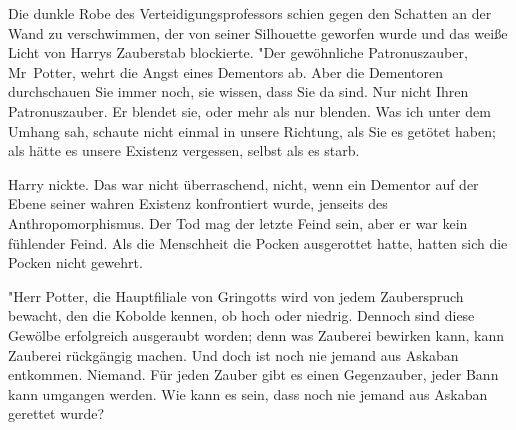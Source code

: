 Die dunkle Robe des Verteidigungsprofessors schien gegen den Schatten an der Wand zu verschwimmen, der von seiner Silhouette geworfen wurde und das weiße Licht von Harrys Zauberstab blockierte. "Der gewöhnliche Patronuszauber, Mr~Potter, wehrt die Angst eines Dementors ab. Aber die Dementoren durchschauen Sie immer noch, sie wissen, dass Sie da sind. Nur nicht Ihren Patronuszauber. Er blendet sie, oder mehr als nur blenden. Was ich unter dem Umhang sah, schaute nicht einmal in unsere Richtung, als Sie es getötet haben; als hätte es unsere Existenz vergessen, selbst als es starb.

Harry nickte. Das war nicht überraschend, nicht, wenn ein Dementor auf der Ebene seiner wahren Existenz konfrontiert wurde, jenseits des Anthropomorphismus. Der Tod mag der letzte Feind sein, aber er war kein fühlender Feind. Als die Menschheit die Pocken ausgerottet hatte, hatten sich die Pocken nicht gewehrt.

"Herr Potter, die Hauptfiliale von Gringotts wird von jedem Zauberspruch bewacht, den die Kobolde kennen, ob hoch oder niedrig. Dennoch sind diese Gewölbe erfolgreich ausgeraubt worden; denn was Zauberei bewirken kann, kann Zauberei rückgängig machen. Und doch ist noch nie jemand aus Askaban entkommen. Niemand. Für jeden Zauber gibt es einen Gegenzauber, jeder Bann kann umgangen werden. Wie kann es sein, dass noch nie jemand aus Askaban gerettet wurde?


